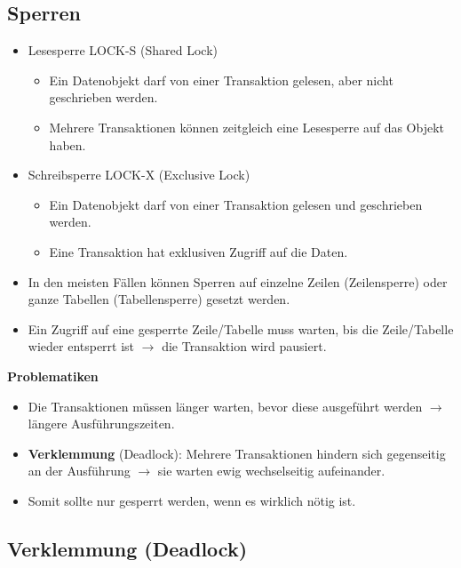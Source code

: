         \subsection{Sperren} %
            \begin{itemize}
            	\item Lesesperre LOCK-S (Shared Lock)
            		\begin{itemize}
            			\item Ein Datenobjekt darf von einer Transaktion gelesen, aber nicht geschrieben werden.
            			\item Mehrere Transaktionen können zeitgleich eine Lesesperre auf das Objekt haben.
            		\end{itemize}
            	\item Schreibsperre LOCK-X (Exclusive Lock)
            		\begin{itemize}
            			\item Ein Datenobjekt darf von einer Transaktion gelesen und geschrieben werden.
            			\item Eine Transaktion hat exklusiven Zugriff auf die Daten.
            		\end{itemize}
            	\item In den meisten Fällen können Sperren auf einzelne Zeilen (Zeilensperre) oder ganze Tabellen (Tabellensperre) gesetzt werden.
            	\item Ein Zugriff auf eine gesperrte Zeile/Tabelle muss warten, bis die Zeile/Tabelle wieder entsperrt ist \(\rightarrow\) die Transaktion wird pausiert.
            \end{itemize}
        
        	\textbf{Problematiken}
        	\begin{itemize}
        		\item Die Transaktionen müssen länger warten, bevor diese ausgeführt werden \(\rightarrow\) längere Ausführungszeiten.
        		\item \textbf{Verklemmung} (Deadlock): Mehrere Transaktionen hindern sich gegenseitig an der Ausführung \(\rightarrow\) sie warten ewig wechselseitig aufeinander.
        		\item Somit sollte nur gesperrt werden, wenn es wirklich nötig ist.
        	\end{itemize}

        \subsection{Verklemmung (Deadlock)} %
        	\label{sec:deadlock}
        
